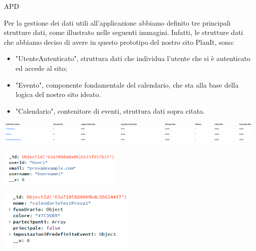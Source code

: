 \begin{listaPersonale} {APD}
\begin{center}
    \end{center}
    \newpage
    Per la gestione dei dati utili all'applicazione abbiamo definito tre principali strutture dati, come illustrato nelle seguenti immagini. Infatti, le strutture dati che abbiamo deciso di avere in questo prototipo del nostro sito PlanIt, sono:
    \begin{itemize}
        \item "UtenteAutenticato", struttura dati che individua l'utente che si è autenticato ed accede al sito;
        \item "Evento", componente fondamentale del calendario, che sta alla base della logica del nostro sito ideato.
        \item "Calendario", contenitore di eventi, struttura dati sopra citata.
    \end{itemize}
    \begin{center}
        \includegraphics[width=1.1\textwidth, height=0.07\textheight]{img/png/DB/collections.png}
    \end{center}
    \begin{center}
        \includegraphics[width=0.45\textwidth, height=0.1\textheight]{img/png/DB/utente_autenticato.png}
    \end{center}
    \begin{center}
        \includegraphics[width=0.5\textwidth, height=0.15\textheight]{img/png/DB/calendario.png}

\end{center}
\end{listaPersonale}
